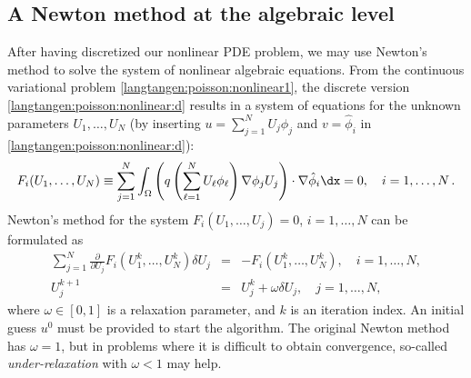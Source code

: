 \subsection{A Newton method at the algebraic level}
\label{langtangen:nonlinear:Newton:algebraic}
\label{Newton's method algebraic}

After having discretized our nonlinear PDE problem, we may
use Newton's method to solve the system of nonlinear algebraic equations.
From the continuous variational problem \eqref{langtangen:poisson:nonlinear1},
the discrete version \eqref{langtangen:poisson:nonlinear:d} results in a
system of equations for the unknown parameters $U_1,\ldots, U_N$
(by inserting $u = \sum_{j=1}^N U_j \phi_j$
and $v=\hat\phi_i$ in \eqref{langtangen:poisson:nonlinear:d}):
\begin{equation}
\label{langtangen:nonlinear:Newton:F1}
F_i(U_1,\ldots,U_N) \equiv
\sum_{j=1}^N
\int_\Omega \left( q\left(\sum_{\ell=1}^NU_\ell\phi_\ell\right)
\nabla \phi_j U_j\right)\cdot \nabla \hat\phi_i\dx = 0,\quad i=1,\ldots,N\langtangenep
\end{equation}
Newton's method for the system $F_i(U_1,\ldots,U_j)=0$, $i=1,\ldots,N$
can be formulated as
\begin{eqnarray}
\sum_{j=1}^N
\frac{\partial}{\partial U_j} F_i(U_1^k,\ldots,U_N^k)\delta U_j
&=& -F_i(U_1^k,\ldots,U_N^k),\quad i=1,\ldots,N,\\
U_j^{k+1} &=& U_j^k + \omega\delta U_j,\quad j=1,\ldots,N,
\end{eqnarray}
where $\omega\in [0,1]$ is a relaxation parameter, and $k$ is an
iteration index. An initial guess $u^0$ must be provided to start the
algorithm.  The original Newton method has $\omega=1$, but in problems
where it is difficult to obtain convergence, so-called
\emph{under-relaxation} with $\omega < 1$ may
help.

